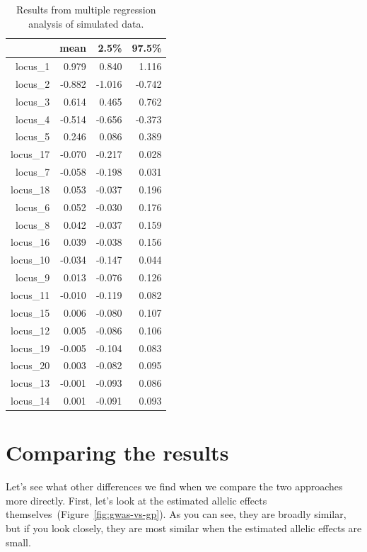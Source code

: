\begin{table}
\centering
\begin{tabular}{rrrr}
  \hline
 & mean & 2.5\% & 97.5\% \\ 
  \hline
locus\_1  & 0.979  & 0.840  & 1.116 \\
locus\_2  & -0.882 & -1.016 & -0.742 \\
locus\_3  & 0.614 &  0.465  & 0.762 \\
locus\_4  & -0.514 & -0.656 & -0.373 \\
locus\_5  & 0.246  & 0.086  & 0.389 \\
locus\_17 & -0.070 & -0.217 & 0.028 \\
locus\_7  & -0.058 & -0.198 & 0.031 \\
locus\_18 & 0.053  & -0.037 & 0.196 \\
locus\_6  & 0.052  & -0.030 & 0.176 \\
locus\_8  & 0.042  & -0.037 & 0.159 \\
locus\_16 & 0.039  & -0.038 & 0.156 \\
locus\_10 & -0.034 & -0.147 & 0.044 \\
locus\_9  & 0.013  & -0.076 & 0.126 \\
locus\_11 & -0.010 & -0.119 & 0.082 \\
locus\_15 & 0.006  & -0.080 & 0.107 \\
locus\_12 & 0.005  & -0.086 & 0.106 \\
locus\_19 & -0.005 & -0.104 & 0.083 \\
locus\_20 & 0.003  & -0.082 & 0.095 \\
locus\_13 & -0.001 & -0.093 & 0.086 \\
locus\_14 & 0.001  & -0.091 & 0.093 \\
  \hline
\end{tabular}
\caption{Results from multiple regression analysis of simulated
  data.}\label{table:multiple} 
\end{table}

\section*{Comparing the results}

Let's see what other differences we find when we compare the two
approaches more directly. First, let's look at the estimated allelic
effects themselves~(Figure~\ref{fig:gwas-vs-gp}). As you can see, they
are broadly similar, but if you look closely, they are most similar
when the estimated allelic effects are small.

